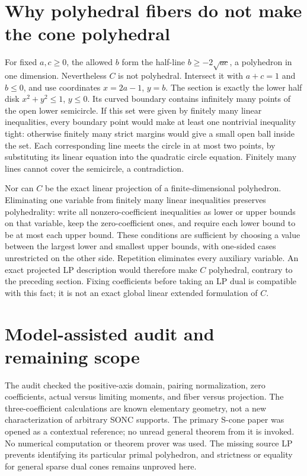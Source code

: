 \documentclass[11pt]{article}
\begin{document}
\section{Why polyhedral fibers do not make the cone polyhedral}
For fixed $a,c\ge0$, the allowed $b$ form the half-line
$b\ge-2\sqrt{ac}$, a polyhedron in one dimension.
Nevertheless $C$ is not polyhedral. Intersect it with $a+c=1$ and
$b\le0$, and use coordinates $x=2a-1$, $y=b$. The section is exactly
the lower half disk $x^2+y^2\le1$, $y\le0$. Its curved boundary
contains infinitely many points of the open lower semicircle.
If this set were given by finitely many linear inequalities, every
boundary point would make at least one nontrivial inequality tight:
otherwise finitely many strict margins would give a small open ball
inside the set. Each corresponding line meets the circle in at most
two points, by substituting its linear equation into the quadratic
circle equation. Finitely many lines cannot cover the semicircle,
a contradiction.

Nor can $C$ be the exact linear projection of a finite-dimensional
polyhedron. Eliminating one variable from finitely many linear
inequalities preserves polyhedrality: write all nonzero-coefficient
inequalities as lower or upper bounds on that variable, keep the
zero-coefficient ones, and require each lower bound to be at most
each upper bound. These conditions are sufficient by choosing a value
between the largest lower and smallest upper bounds, with one-sided
cases unrestricted on the other side. Repetition eliminates every
auxiliary variable. An exact projected LP description would therefore
make $C$ polyhedral, contrary to the preceding section.
Fixing coefficients before taking an LP dual is compatible with this
fact; it is not an exact global linear extended formulation of $C$.

\section{Model-assisted audit and remaining scope}
The audit checked the positive-axis domain, pairing normalization,
zero coefficients, actual versus limiting moments, and fiber versus
projection. The three-coefficient calculations are known elementary
geometry, not a new characterization of arbitrary SONC supports.
The primary S-cone paper was opened as a contextual reference; no
unread general theorem from it is invoked. No numerical computation
or theorem prover was used. The missing source LP prevents identifying
its particular primal polyhedron, and strictness or equality for
general sparse dual cones remains unproved here.
\end{document}
